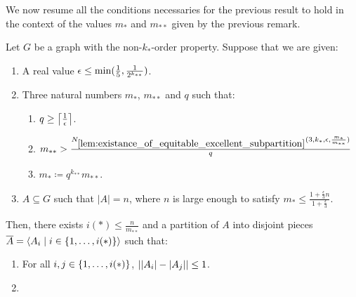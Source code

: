         We now resume all the conditions necessaries for the previous result to hold in the context of the values
        $m_*$ and $m_{**}$ given by the previous remark.

        \begin{lemma}[Corollary 5.15] \label{lem:resume_of_all_conditions_for_excellent_partitions}
            Let $G$ be a graph with the non-$k_{*}$-order property.
            Suppose that we are given:
            \begin{enumerate}
                \item A real value $\epsilon \leq \min ( \frac{1}{5}, \frac{1}{2^{k_{**}}} )$.
                \item Three natural numbers $m_*$, $m_{**}$ and $q$ such that:
                    \begin{enumerate}[label=(\alph*), ref=2.\alph*]
                        \item \label{itm:resume_of_all_conditions_for_excellent_partitions.a} $q \geq \left\lceil \frac{1}{\epsilon} \right\rceil$.
                        \item \label{itm:resume_of_all_conditions_for_excellent_partitions.b}
                            $m_{**} > \frac{N_{\ref{lem:existance_of_equitable_excellent_subpartition}}
                                ( 3, k_*, \epsilon, \frac{m_*}{m_{**}} )}{q}$
                        \item \label{itm:resume_of_all_conditions_for_excellent_partitions.c} $m_* \coloneqq q^{k_{**}} m_{**}$.
                \end{enumerate}
                \item \label{itm:resume_of_all_conditions_for_excellent_partitions.3}
                    $A \subseteq G$ such that $|A| = n$, where $n$ is large enough to satisfy
                    $m_* \leq \frac{1 + \frac{\epsilon}{3}n}{1 + \frac{\epsilon}{3}}$.
            \end{enumerate}
            Then, there exists $i(*) \leq \frac{n}{m_{**}}$ and a partition of $A$ into disjoint pieces
            $\overline{A} = \left< A_i \mid i \in \{ 1, \dots, i(*) \} \right>$ such that:
            \begin{enumerate}[label=(\roman*), ref=\roman*]
                \item \label{itm:resume_of_all_conditions_for_excellent_partitions.i}
                    For all $i, j \in \{ 1, \dots, i(*) \}$, $| | A_i |- | A_j | | \leq 1$.
                \item \label{itm:resume_of_all_conditions_for_excellent_partitions.ii}

\end{enumerate}
\end{lemma}
